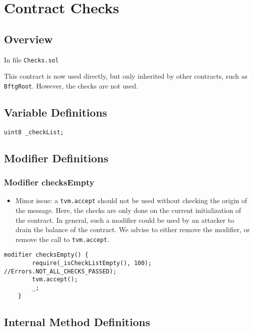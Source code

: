
\chapter{Contract Checks}

\minitoc

\section{Overview}

In file {\tt Checks.sol}

This contract is now used directly, but only inherited by other
contracts, such as {\tt BftgRoot}. However, the checks are not used.

\section{Variable Definitions}


\begin{lstlisting}[firstnumber=4]
    uint8 _checkList;
\end{lstlisting}

\section{Modifier Definitions}


\subsection{Modifier checksEmpty}

\begin{itemize}
\item Minor issue: a {\tt tvm.accept} should not be used without
  checking the origin of the message. Here, the checks are only done
  on the current initialization of the contract. In general, such a
  modifier could be used by an attacker to drain the balance of the
  contract. We advise to either remove the modifier, or remove the
  call to {\tt tvm.accept}.
\end{itemize}

\begin{lstlisting}[firstnumber=12]
    modifier checksEmpty() {
        require(_isCheckListEmpty(), 100); //Errors.NOT_ALL_CHECKS_PASSED);
        tvm.accept();
        _;
    }
\end{lstlisting}

\section{Internal Method Definitions}


